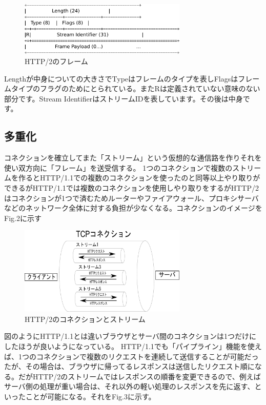 \documentclass[a4j,9pt,twocolumn]{jsarticle}
\begin{document}
\begin{figure}[h]
\centering
\includegraphics[width=80mm]{img/flame.eps}
\caption{HTTP/2のフレーム}
\end{figure}

Lengthが中身についての大きさでTypeはフレームのタイプを表しFlagsはフレームタイプのフラグのためにとられている。またRは定義されていない意味のない部分です。Stream IdentifierはストリームIDを表しています。その後は中身です。

\subsection{多重化}
コネクションを確立してまた「ストリーム」という仮想的な通信路を作りそれを使い双方向に「フレーム」を送受信する。
1つのコネクションで複数のストリームを作るとHTTP/1.1での複数のコネクションを使ったのと同等以上やり取りができるがHTTP/1.1では複数のコネクションを使用しやり取りをするがHTTP/2はコネクションが1つで済むためルーターやファイアウォール、プロキシサーバなどのネットワーク全体に対する負担が少なくなる。コネクションのイメージをFig.2に示す

\begin{figure}[h]
\centering
\includegraphics[width=80mm]{img/TCPco.eps}
\caption{HTTP/2のコネクションとストリーム}
\end{figure}

図のようにHTTP/1.1とは違いブラウザとサーバ間のコネクションは1つだけにしたほうが良いようになっている。
HTTP/1.1でも「パイプライン」機能を使えば、1つのコネクションで複数のリクエストを連続して送信することが可能だったが、その場合は、ブラウザに帰ってるレスポンスは送信したリクエスト順になる。だがHTTP/2のストリームではレスポンスの順番を変更できるので、例えばサーバ側の処理が重い場合は、それ以外の軽い処理のレスポンスを先に返す、といったことが可能になる。それをFig.3に示す。
\end{document}
